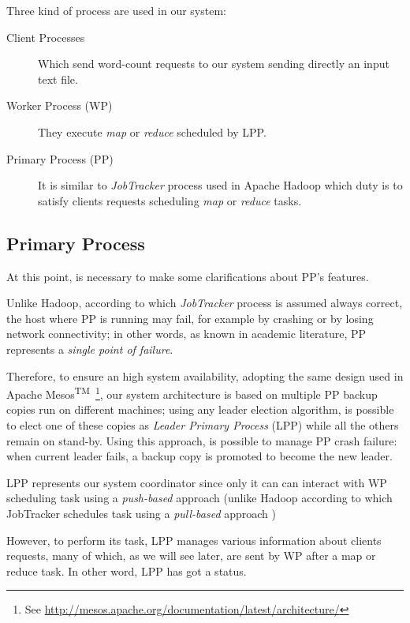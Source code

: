 \documentclass[sigchi]{acmart}
\begin{document}
Three kind of process are used in our system:

\begin{description}
\item[Client Processes] Which send word-count requests to our system sending directly an input text file. 

\item[Worker Process (WP)] They execute \textit{map} or \textit{reduce} scheduled by LPP.

\item[Primary Process (PP)] It is similar to \textit{JobTracker} process used in Apache Hadoop which duty is to satisfy clients requests scheduling \textit{map} or \textit{reduce} tasks. 
\end{description}

\subsection{Primary Process}
At this point, is necessary to make some clarifications about PP's features.

Unlike Hadoop, according to which \textit{JobTracker} process is assumed always correct, the host where PP is running may fail, for example by crashing or by losing network connectivity; in other words, as known in academic literature, PP represents a \textit{single point of failure}.

Therefore, to ensure an high system availability, adopting the same design used in Apache Mesos\textsuperscript{TM}\ \footnote{See \url{http://mesos.apache.org/documentation/latest/architecture/}}, our system architecture is based on multiple PP backup copies run on different machines; using any leader election algorithm, is possible to elect one of these copies as \textit{Leader Primary Process} (LPP) while all the others remain on stand-by. Using this approach, is possible to manage PP crash failure: when current leader fails, a backup copy is promoted to become the new leader. 

LPP represents our system coordinator since only it can can interact with WP scheduling task using a \textit{push-based} approach (unlike Hadoop according to which JobTracker schedules task using a \textit{pull-based} approach \cite{LARTS})

However, to perform its task, LPP manages various information about clients requests, many of which, as we will see later, are sent by WP after a map or reduce task. In other word, LPP has got a status.
\end{document}
